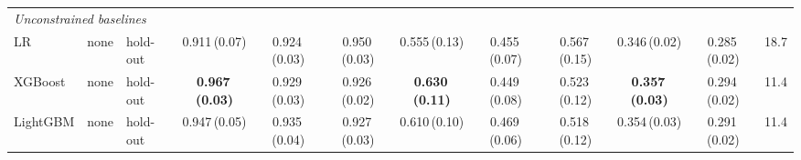 \begin{table}[!tbp]
{\begin{tabular}{lllccccccccc}
\midrule
\multicolumn{12}{l}{\textit{Unconstrained baselines}} \\
LR & none & hold-out & 0.911\,{\scriptsize(0.07)} & 0.924\,{\scriptsize(0.03)} & 0.950\,{\scriptsize(0.03)} & 0.555\,{\scriptsize(0.13)} & 0.455\,{\scriptsize(0.07)} & 0.567\,{\scriptsize(0.15)} & 0.346\,{\scriptsize(0.02)} & 0.285\,{\scriptsize(0.02)} & 18.7 \\
XGBoost & none & hold-out & \textbf{0.967\,{\scriptsize(0.03)}} & 0.929\,{\scriptsize(0.03)} & 0.926\,{\scriptsize(0.02)} & \textbf{0.630\,{\scriptsize(0.11)}} & 0.449\,{\scriptsize(0.08)} & 0.523\,{\scriptsize(0.12)} & \textbf{0.357\,{\scriptsize(0.03)}} & 0.294\,{\scriptsize(0.02)} & 11.4 \\
LightGBM & none & hold-out & 0.947\,{\scriptsize(0.05)} & 0.935\,{\scriptsize(0.04)} & 0.927\,{\scriptsize(0.03)} & 0.610\,{\scriptsize(0.10)} & 0.469\,{\scriptsize(0.06)} & 0.518\,{\scriptsize(0.12)} & 0.354\,{\scriptsize(0.03)} & 0.291\,{\scriptsize(0.02)} & 11.4 \\
\bottomrule\end{tabular}}
\end{table}
